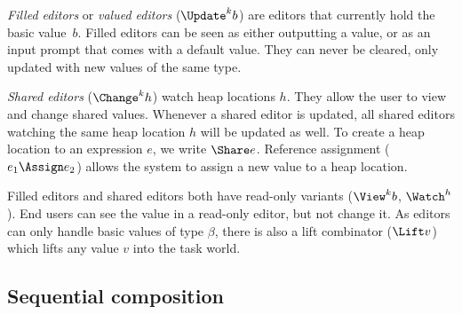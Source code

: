   \item
    \emph{Filled editors} or \emph{valued editors} ($\Update^k b$) are editors that currently hold the basic value~$b$.
    Filled editors can be seen as either outputting a value, or as an input prompt that comes with a default value.
    They can never be cleared, only updated with new values of the same type.

  \item
    \emph{Shared editors} ($\Change^k h$) watch heap locations $h$.
    They allow the user to view and change shared values.
    Whenever a shared editor is updated, all shared editors watching the same heap location $h$ will be updated as well.
    To create a heap location to an expression $e$, we write $\Share e$.
    Reference assignment ($e_1 \Assign e_2$) allows the system to assign a new value to a heap location.
\stopitemize

% 

Filled editors and shared editors both have read-only variants ($\View^k b$, $\Watch^ h$).
End users can see the value in a read-only editor, but not change it.
As editors can only handle basic values of type $\beta$,
there is also a lift combinator ($\Lift v$) which lifts any value $v$ into the task world.



\subsection{Sequential composition}

